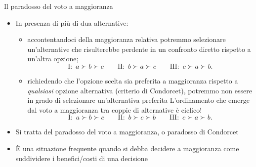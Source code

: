 \documentclass[11pt]{beamer}
\begin{document}
\begin{frame}{Il paradosso del voto a maggioranza}
\begin{itemize}
\item In presenza di più di dua alternative:
\begin{itemize}
\item accontentandoci della \alert{maggioranza relativa} potremmo selezionare
un'alternative che risulterebbe perdente in un confronto diretto rispetto
a un'altra opzione;
\begin{equation*}
\text{I:}\enspace a \succ b \succ c \qquad 
\text{II:}\enspace b \succ a \succ c \qquad 
\text{III:}\enspace c \succ a \succ b.
\end{equation*}
\item richiedendo che l'opzione scelta sia preferita a maggioranza rispetto a
\emph{qualsiasi} opzione alternativa (criterio di Condorcet), potremmo non
essere in grado di selezionare un'alternativa preferita
L'ordinamento che emerge dal voto a maggioranza tra coppie di alternative
è \alert{ciclico}!
\begin{equation*}
\text{I:}\enspace a \succ b \succ c \qquad 
\text{II:}\enspace b \succ c \succ b \qquad 
\text{III:}\enspace c \succ a \succ b.
\end{equation*}
\end{itemize}
\item Si tratta del \alert{paradosso del voto a maggioranza}, o \alert{paradosso di Condorcet}
\item È una situazione frequente quando si debba decidere a maggioranza
come suddividere i benefici/costi di una decisione
\end{itemize}
\end{frame}
\end{document}
